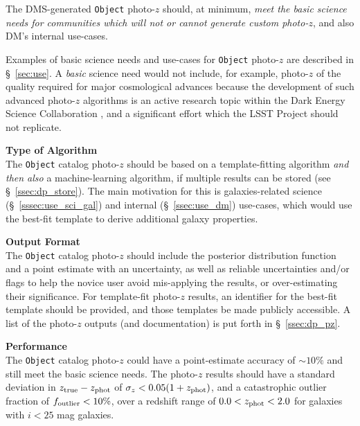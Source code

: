\documentclass[DM,lsstdraft,toc]{lsstdoc}
\begin{document}
The DMS-generated {\tt Object} photo-$z$ should, at minimum, {\it meet the basic science needs for communities which will not or cannot generate custom photo-$z$}, and also DM's internal use-cases.

Examples of basic science needs and use-cases for {\tt Object} photo-$z$ are described in \S~\ref{sec:use}.
A {\it basic} science need would not include, for example, photo-$z$ of the quality required for major cosmological advances because the development of such advanced photo-$z$ algorithms is an active research topic within the Dark Energy Science Collaboration \cite{2018arXiv180901669T}, and a significant effort which the LSST Project should not replicate. 


{\bf Type of Algorithm}\\
The {\tt Object} catalog photo-$z$ should be based on a template-fitting algorithm {\it and then also} a machine-learning algorithm, if multiple results can be stored (see \S~\ref{ssec:dp_store}).
The main motivation for this is galaxies-related science (\S~\ref{sssec:use_sci_gal}) and internal (\S~\ref{ssec:use_dm}) use-cases, which would use the best-fit template to derive additional galaxy properties.

{\bf Output Format}\\
The {\tt Object} catalog photo-$z$ should include the posterior distribution function and a point estimate with an uncertainty, as well as reliable uncertainties and/or flags to help the novice user avoid mis-applying the results, or over-estimating their significance.
For template-fit photo-$z$ results, an identifier for the best-fit template should be provided, and those templates be made publicly accessible.
A list of the photo-$z$ outputs (and documentation) is put forth in \S~\ref{ssec:dp_pz}.

{\bf Performance}\\
The {\tt Object} catalog photo-$z$ could have a point-estimate accuracy of $\sim10\%$ and still meet the basic science needs.
The photo-$z$ results should have a standard deviation in $z_{\rm true}-z_{\rm phot}$ of $\sigma_z < 0.05(1+z_{\rm phot})$, and a catastrophic outlier fraction of $f_{\rm outlier} < 10\%$, over a redshift range of $0.0 < z_{\rm phot} < 2.0$ for galaxies with $i<25$ mag galaxies.
\end{document}
